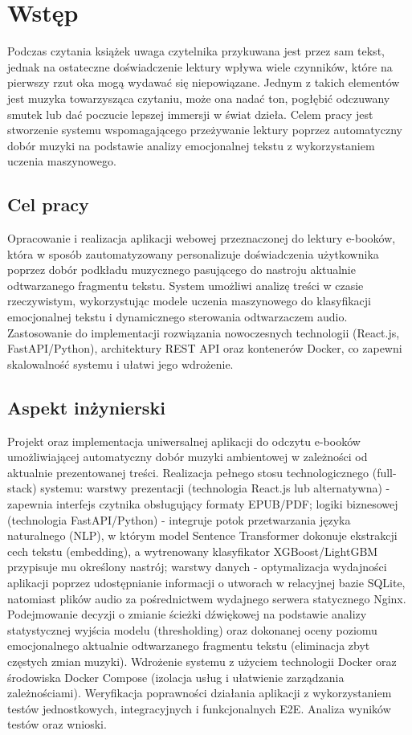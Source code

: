\chapter{Wstęp}
\label{chapt:Wstep}

Podczas czytania książek uwaga czytelnika przykuwana jest przez sam tekst, jednak na ostateczne doświadczenie lektury wpływa wiele czynników, które na pierwszy rzut oka mogą wydawać się niepowiązane. Jednym z takich elementów jest muzyka towarzysząca czytaniu, może ona nadać ton, pogłębić odczuwany smutek lub dać poczucie lepszej immersji w świat dzieła. Celem pracy jest stworzenie systemu wspomagającego przeżywanie lektury poprzez automatyczny dobór muzyki na podstawie analizy emocjonalnej tekstu z wykorzystaniem uczenia maszynowego.

\section{Cel pracy}
Opracowanie i realizacja aplikacji webowej przeznaczonej do lektury e-booków, która w sposób
zautomatyzowany personalizuje doświadczenia użytkownika poprzez dobór podkładu muzycznego
pasującego do nastroju aktualnie odtwarzanego fragmentu tekstu. System umożliwi analizę treści w
czasie rzeczywistym, wykorzystując modele uczenia maszynowego do klasyfikacji emocjonalnej tekstu
i dynamicznego sterowania odtwarzaczem audio. Zastosowanie do implementacji rozwiązania
nowoczesnych technologii (React.js, FastAPI/Python), architektury REST API oraz kontenerów
Docker, co zapewni skalowalność systemu i ułatwi jego wdrożenie.

\section{Aspekt inżynierski}
Projekt oraz implementacja uniwersalnej aplikacji do odczytu e-booków umożliwiającej automatyczny
dobór muzyki ambientowej w zależności od aktualnie prezentowanej treści. Realizacja pełnego stosu
technologicznego (full-stack) systemu: warstwy prezentacji (technologia React.js lub alternatywna) -
zapewnia interfejs czytnika obsługujący formaty EPUB/PDF; logiki biznesowej (technologia
FastAPI/Python) - integruje potok przetwarzania języka naturalnego (NLP), w którym model Sentence
Transformer dokonuje ekstrakcji cech tekstu (embedding), a wytrenowany klasyfikator
XGBoost/LightGBM przypisuje mu określony nastrój; warstwy danych - optymalizacja wydajności
aplikacji poprzez udostępnianie informacji o utworach w relacyjnej bazie SQLite, natomiast plików
audio za pośrednictwem wydajnego serwera statycznego Nginx. Podejmowanie decyzji o zmianie
ścieżki dźwiękowej na podstawie analizy statystycznej wyjścia modelu (thresholding) oraz dokonanej
oceny poziomu emocjonalnego aktualnie odtwarzanego fragmentu tekstu (eliminacja zbyt częstych
zmian muzyki). Wdrożenie systemu z użyciem technologii Docker oraz środowiska Docker Compose
(izolacja usług i ułatwienie zarządzania zależnościami). Weryfikacja poprawności działania aplikacji z
wykorzystaniem testów jednostkowych, integracyjnych i funkcjonalnych E2E. Analiza wyników testów
oraz wnioski. 

